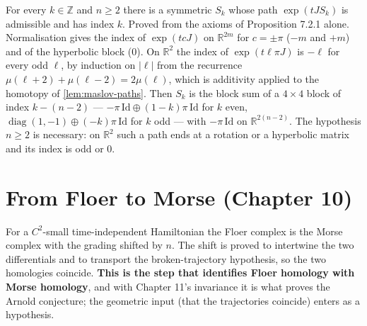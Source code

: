 \begin{lemma}[Lemma 7.2.4]
  \label{lem:7.2.4}
  \leanok
  For every $k \in \mathbb{Z}$ and $n \ge 2$ there is a symmetric $S_k$ whose path
  $\exp(tJS_k)$ is admissible and has index $k$.  Proved from the axioms of
  Proposition 7.2.1 alone.  Normalisation gives the index of $\exp(tcJ)$ on
  $\mathbb{R}^{2m}$ for $c = \pm\pi$ ($-m$ and $+m$) and of the hyperbolic block
  ($0$).  On $\mathbb{R}^2$ the index of $\exp(t\ell\pi J)$ is $-\ell$ for every odd
  $\ell$, by induction on $|\ell|$ from the recurrence
  $\mu(\ell+2) + \mu(\ell-2) = 2\mu(\ell)$, which is additivity applied to the
  homotopy of \ref{lem:maslov-paths}.  Then $S_k$ is the block sum of a $4\times 4$
  block of index $k - (n-2)$ — $-\pi\,\mathrm{Id} \oplus (1-k)\pi\,\mathrm{Id}$ for
  $k$ even, $\operatorname{diag}(1,-1) \oplus (-k)\pi\,\mathrm{Id}$ for $k$ odd —
  with $-\pi\,\mathrm{Id}$ on $\mathbb{R}^{2(n-2)}$.  The hypothesis $n \ge 2$ is
  necessary: on $\mathbb{R}^2$ such a path ends at a rotation or a hyperbolic
  matrix and its index is odd or $0$.
\end{lemma}

\chapter{From Floer to Morse (Chapter 10)}

\begin{theorem}
  \label{thm:10.1.1}
  \leanok
  For a $C^2$-small time-independent Hamiltonian the Floer complex is the Morse
  complex with the grading shifted by $n$.  The shift is proved to intertwine the
  two differentials and to transport the broken-trajectory hypothesis, so the two
  homologies coincide.  \textbf{This is the step that identifies Floer homology
  with Morse homology}, and with Chapter 11's invariance it is what proves the
  Arnold conjecture; the geometric input (that the trajectories coincide) enters
  as a hypothesis.
\end{theorem}

